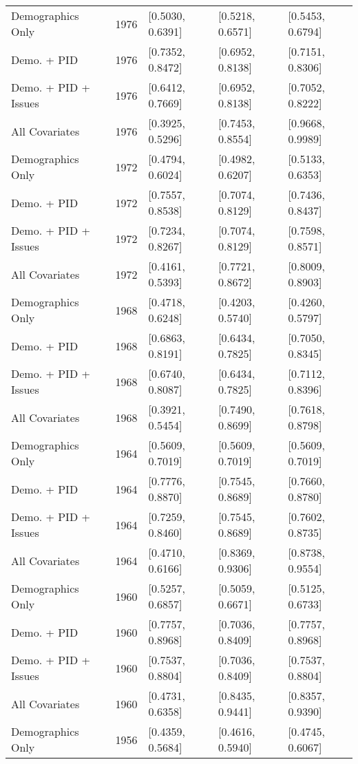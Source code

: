 \begin{longtable}{lrlll}
  Demographics Only & 1976 & [0.5030, 0.6391] & [0.5218, 0.6571] & [0.5453, 0.6794] \\ 
  Demo. + PID & 1976 & [0.7352, 0.8472] & [0.6952, 0.8138] & [0.7151, 0.8306] \\ 
  Demo. + PID + Issues & 1976 & [0.6412, 0.7669] & [0.6952, 0.8138] & [0.7052, 0.8222] \\ 
  All Covariates & 1976 & [0.3925, 0.5296] & [0.7453, 0.8554] & [0.9668, 0.9989] \\ 
  Demographics Only & 1972 & [0.4794, 0.6024] & [0.4982, 0.6207] & [0.5133, 0.6353] \\ 
  Demo. + PID & 1972 & [0.7557, 0.8538] & [0.7074, 0.8129] & [0.7436, 0.8437] \\ 
  Demo. + PID + Issues & 1972 & [0.7234, 0.8267] & [0.7074, 0.8129] & [0.7598, 0.8571] \\ 
  All Covariates & 1972 & [0.4161, 0.5393] & [0.7721, 0.8672] & [0.8009, 0.8903] \\ 
  Demographics Only & 1968 & [0.4718, 0.6248] & [0.4203, 0.5740] & [0.4260, 0.5797] \\ 
  Demo. + PID & 1968 & [0.6863, 0.8191] & [0.6434, 0.7825] & [0.7050, 0.8345] \\ 
  Demo. + PID + Issues & 1968 & [0.6740, 0.8087] & [0.6434, 0.7825] & [0.7112, 0.8396] \\ 
  All Covariates & 1968 & [0.3921, 0.5454] & [0.7490, 0.8699] & [0.7618, 0.8798] \\ 
  Demographics Only & 1964 & [0.5609, 0.7019] & [0.5609, 0.7019] & [0.5609, 0.7019] \\ 
  Demo. + PID & 1964 & [0.7776, 0.8870] & [0.7545, 0.8689] & [0.7660, 0.8780] \\ 
  Demo. + PID + Issues & 1964 & [0.7259, 0.8460] & [0.7545, 0.8689] & [0.7602, 0.8735] \\ 
  All Covariates & 1964 & [0.4710, 0.6166] & [0.8369, 0.9306] & [0.8738, 0.9554] \\ 
  Demographics Only & 1960 & [0.5257, 0.6857] & [0.5059, 0.6671] & [0.5125, 0.6733] \\ 
  Demo. + PID & 1960 & [0.7757, 0.8968] & [0.7036, 0.8409] & [0.7757, 0.8968] \\ 
  Demo. + PID + Issues & 1960 & [0.7537, 0.8804] & [0.7036, 0.8409] & [0.7537, 0.8804] \\ 
  All Covariates & 1960 & [0.4731, 0.6358] & [0.8435, 0.9441] & [0.8357, 0.9390] \\ 
  Demographics Only & 1956 & [0.4359, 0.5684] & [0.4616, 0.5940] & [0.4745, 0.6067] \\ 

\end{longtable}
